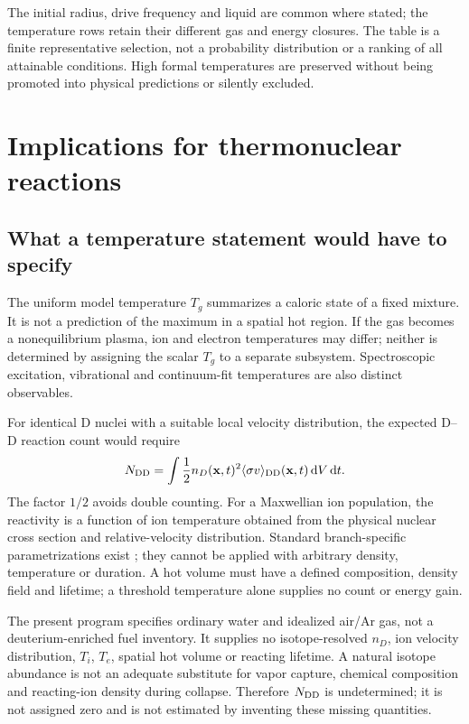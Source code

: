 \documentclass[11pt,a4paper]{article}
\newcommand{\dd}{\mathrm d}
\begin{document}
The initial radius, drive frequency and liquid are common where stated; the temperature rows retain their different gas and energy closures. The table is a finite representative selection, not a probability distribution or a ranking of all attainable conditions. High formal temperatures are preserved without being promoted into physical predictions or silently excluded.
\clearpage
\section{Implications for thermonuclear reactions}
\subsection{What a temperature statement would have to specify}
The uniform model temperature $T_g$ summarizes a caloric state of a fixed mixture. It is not a prediction of the maximum in a spatial hot region. If the gas becomes a nonequilibrium plasma, ion and electron temperatures may differ; neither is determined by assigning the scalar $T_g$ to a separate subsystem. Spectroscopic excitation, vibrational and continuum-fit temperatures are also distinct observables.

For identical D nuclei with a suitable local velocity distribution, the expected D--D reaction count would require
\begin{equation}
N_{\rm DD}=\int\frac12 n_D(\mathbf x,t)^2\langle\sigma v\rangle_{\rm DD}(\mathbf x,t)\,\dd V\,\dd t.
\end{equation}
The factor $1/2$ avoids double counting. For a Maxwellian ion population, the reactivity is a function of ion temperature obtained from the physical nuclear cross section and relative-velocity distribution. Standard branch-specific parametrizations exist \cite{reactivity}; they cannot be applied with arbitrary density, temperature or duration. A hot volume must have a defined composition, density field and lifetime; a threshold temperature alone supplies no count or energy gain.

The present program specifies ordinary water and idealized air/Ar gas, not a deuterium-enriched fuel inventory. It supplies no isotope-resolved $n_D$, ion velocity distribution, $T_i$, $T_e$, spatial hot volume or reacting lifetime. A natural isotope abundance is not an adequate substitute for vapor capture, chemical composition and reacting-ion density during collapse. Therefore $N_{\rm DD}$ is undetermined; it is not assigned zero and is not estimated by inventing these missing quantities.
\end{document}
